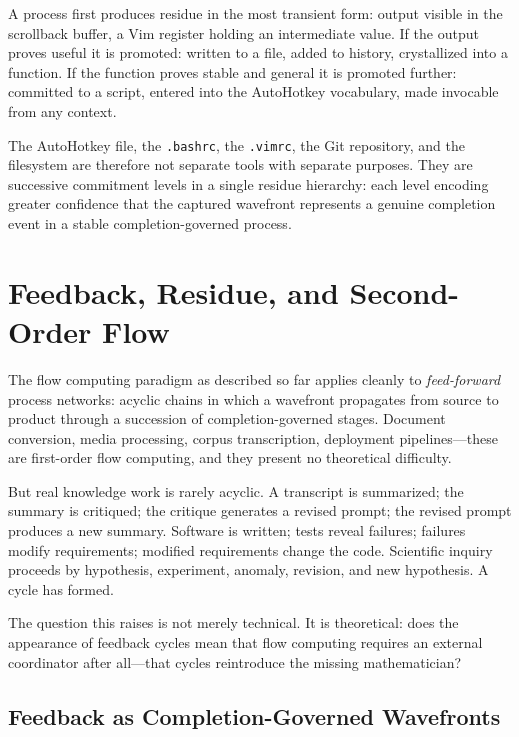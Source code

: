 \documentclass[12pt, a4paper]{article}
\begin{document}
A process first produces residue in the most transient form:
output visible in the scrollback buffer, a Vim register holding
an intermediate value. If the output proves useful it is
promoted: written to a file, added to history, crystallized
into a function. If the function proves stable and general
it is promoted further: committed to a script, entered into
the AutoHotkey vocabulary, made invocable from any context.

The AutoHotkey file, the \texttt{.bashrc}, the \texttt{.vimrc},
the Git repository, and the filesystem are therefore not separate
tools with separate purposes. They are successive commitment
levels in a single residue hierarchy: each level encoding
greater confidence that the captured wavefront represents a
genuine completion event in a stable completion-governed process.

\section{Feedback, Residue, and Second-Order Flow}

The flow computing paradigm as described so far applies cleanly to
\emph{feed-forward} process networks: acyclic chains in which a
wavefront propagates from source to product through a succession of
completion-governed stages. Document conversion, media processing,
corpus transcription, deployment pipelines---these are first-order
flow computing, and they present no theoretical difficulty.

But real knowledge work is rarely acyclic. A transcript is
summarized; the summary is critiqued; the critique generates a
revised prompt; the revised prompt produces a new summary. Software
is written; tests reveal failures; failures modify requirements;
modified requirements change the code. Scientific inquiry proceeds
by hypothesis, experiment, anomaly, revision, and new hypothesis.
A cycle has formed.

The question this raises is not merely technical. It is theoretical:
does the appearance of feedback cycles mean that flow computing
requires an external coordinator after all---that cycles reintroduce
the missing mathematician?

\subsection{Feedback as Completion-Governed Wavefronts}
\end{document}
